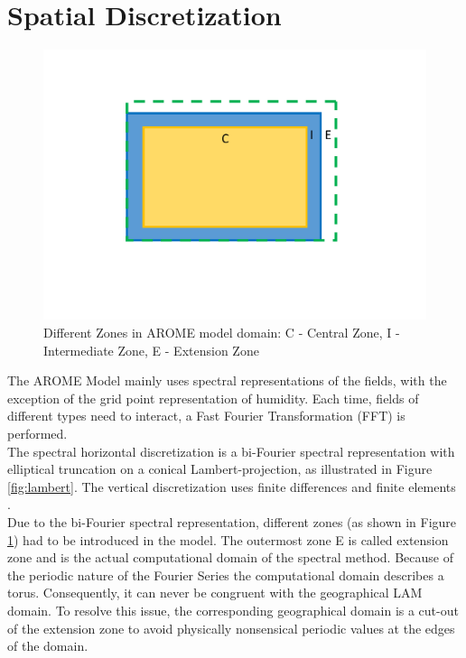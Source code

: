 \section{Spatial Discretization}
\begin{figure}
    \includegraphics[trim={5cm 5cm  5cm  4cm },clip,
     width=0.9\linewidth] {graphics/Zones.png}
    \caption[Zones in AROME's Computational Domain]{Different Zones in AROME model domain: C - Central Zone, I - Intermediate Zone, E - Extension Zone \parencite{gmd-2017-103}}
    \label{fig:zones}
\end{figure}The AROME Model mainly uses spectral representations of the fields, with the exception of the grid point representation of humidity. Each time, fields of different types need to interact, a Fast Fourier Transformation (FFT) is performed. \\
The spectral horizontal discretization is a bi-Fourier spectral representation with elliptical truncation on a conical Lambert-projection, as illustrated in Figure \ref{fig:lambert}. The vertical discretization uses finite differences and finite elements \parencite{gmd-2017-103, meteofrance}.  
\\
Due to the bi-Fourier spectral representation, different zones (as shown in Figure \ref{fig:zones}) had to be introduced in the model.
The outermost zone E is called extension zone and is the actual computational domain of the spectral method. 
Because of the periodic nature of the Fourier Series the computational domain describes a torus. Consequently, it can never be congruent with the geographical LAM domain. To resolve this issue, the corresponding geographical domain is a cut-out of the extension zone to avoid physically nonsensical periodic values at the edges of the domain.
